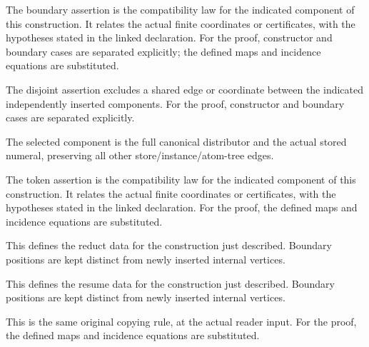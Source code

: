 The boundary assertion is the compatibility law for the indicated component of this construction. It relates the actual finite coordinates or certificates, with the hypotheses stated in the linked declaration.
For the proof, constructor and boundary cases are separated explicitly; the defined maps and incidence equations are substituted.
\par{}

The disjoint assertion excludes a shared edge or coordinate between the indicated independently inserted components.
For the proof, constructor and boundary cases are separated explicitly.
\par{}

The selected component is the full canonical distributor and the actual stored numeral, preserving all other store/instance/atom-tree edges.
\par{}

The token assertion is the compatibility law for the indicated component of this construction. It relates the actual finite coordinates or certificates, with the hypotheses stated in the linked declaration.
For the proof, the defined maps and incidence equations are substituted.
\par{}

This defines the reduct data for the construction just described. Boundary positions are kept distinct from newly inserted internal vertices.
\par{}

This defines the resume data for the construction just described. Boundary positions are kept distinct from newly inserted internal vertices.
\par{}

This is the same original copying rule, at the actual reader input.
For the proof, the defined maps and incidence equations are substituted.
\par{}

